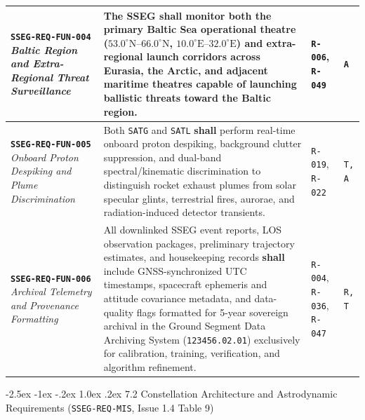 \documentclass[11pt,a4paper]{article}
\makeatletter
\renewcommand\subsection{\@startsection{subsection}{2}{\z@}%
    {-2.5ex \@plus -1ex \@minus -.2ex}%
    {1.0ex \@plus .2ex}%
    {\normalfont\large\bfseries\sffamily\color{SubHeadingBlue}}}
\providecommand{\abbr}[1]{#1}
\makeatother
\begin{document}
{\begin{longtable}{|>{\raggedright\arraybackslash}p{}|>{\raggedright\arraybackslash}p{}|>{\raggedright\arraybackslash}p{}|>{\raggedright\arraybackslash}p{}|}
\textbf{\texttt{SSEG-REQ-FUN-004}} \newline \emph{Baltic Region and Extra-Regional Threat Surveillance} & The \abbr{SSEG} \textbf{shall} monitor both the primary Baltic Sea operational theatre ($53.0^\circ\text{N}\text{--}66.0^\circ\text{N}$, $10.0^\circ\text{E}\text{--}32.0^\circ\text{E}$) and extra-regional launch corridors across Eurasia, the Arctic, and adjacent maritime theatres capable of launching ballistic threats toward the Baltic region. & \texttt{R-006}, \newline \texttt{R-049} & \texttt{A} \\ \hline
\textbf{\texttt{SSEG-REQ-FUN-005}} \newline \emph{Onboard Proton Despiking and Plume Discrimination} & Both \texttt{SATG} and \texttt{SATL} \textbf{shall} perform real-time onboard proton despiking, background clutter suppression, and dual-band spectral/kinematic discrimination to distinguish rocket exhaust plumes from solar specular glints, terrestrial fires, aurorae, and radiation-induced detector transients. & \texttt{R-019}, \newline \texttt{R-022} & \texttt{T, A} \\ \hline
\textbf{\texttt{SSEG-REQ-FUN-006}} \newline \emph{Archival Telemetry and Provenance Formatting} & All downlinked \abbr{SSEG} event reports, \abbr{LOS} observation packages, preliminary trajectory estimates, and housekeeping records \textbf{shall} include GNSS-synchronized UTC timestamps, spacecraft ephemeris and attitude covariance metadata, and data-quality flags formatted for 5-year sovereign archival in the Ground Segment Data Archiving System (\texttt{123456.02.01}) exclusively for calibration, training, verification, and algorithm refinement. & \texttt{R-004}, \texttt{R-036}, \texttt{R-047} & \texttt{R, T} \\ \hline
\end{longtable}}

\subsection{7.2 Constellation Architecture and Astrodynamic Requirements (\texttt{SSEG-REQ-MIS}, Issue 1.4 Table 9)}
\end{document}
